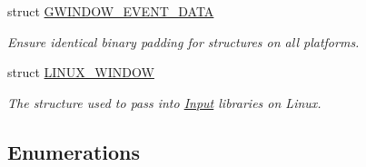 \begin{DoxyCompactItemize}
struct \hyperlink{structGW_1_1SYSTEM_1_1GWINDOW__EVENT__DATA}{G\+W\+I\+N\+D\+O\+W\+\_\+\+E\+V\+E\+N\+T\+\_\+\+D\+A\+TA}
\begin{DoxyCompactList}\small\item\em Ensure identical binary padding for structures on all platforms. \end{DoxyCompactList}\item 
struct \hyperlink{structGW_1_1SYSTEM_1_1LINUX__WINDOW}{L\+I\+N\+U\+X\+\_\+\+W\+I\+N\+D\+OW}
\begin{DoxyCompactList}\small\item\em The structure used to pass into \hyperlink{classInput}{Input} libraries on Linux. \end{DoxyCompactList}\end{DoxyCompactItemize}
\subsection*{Enumerations}
